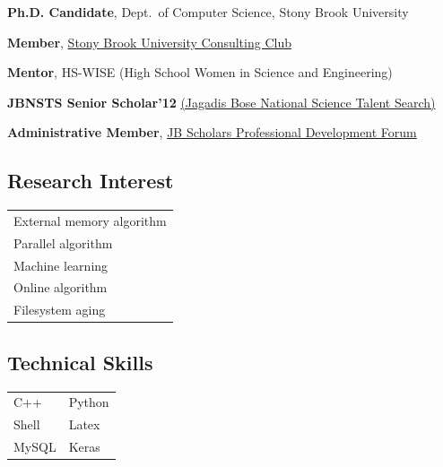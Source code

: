 \documentclass[letterpaper,10pt]{article}
\begin{document}
\begin{minipage}{0.65\textwidth}
\resumeSubHeadingListStart
\item \textbf{Ph.D. Candidate}, Dept.\ of Computer Science, Stony Brook University
\item \textbf{Member}, \href{https://sbuconsultingclub.wixsite.com/sbucc}{Stony Brook University Consulting Club} 
\item \textbf{Mentor}, HS-WISE (High School Women in Science and Engineering)
\item \textbf{JBNSTS Senior Scholar'12} \href{https://jbnsts.ac.in}{(Jagadis Bose National Science Talent Search)}
\item \textbf{Administrative Member}, \href{https://sites.google.com/view/jbspdf/home}{JB Scholars Professional Development Forum}
\resumeSubHeadingListEnd
\end{minipage}
\begin{minipage}{0.1\textwidth}
\end{minipage}
\begin{minipage}{0.25\textwidth}
\subsection*{Research Interest}
\begin{center}
\begin{tabular*}{\textwidth}{ m{5cm} }
\rowcolor{Gray} External memory algorithm \\
\rowcolor{Gray} Parallel algorithm \\
\rowcolor{Gray} Machine learning \\
\rowcolor{Gray} Online algorithm \\
\rowcolor{Gray} Filesystem aging \\
\end{tabular*}
\end{center}
\subsection*{Technical Skills}
\begin{center}
\begin{tabular*}{\textwidth}{ m{3cm} m{2cm} }
\rowcolor{Gray} C++ & Python \\
\rowcolor{Gray} Shell & Latex \\
\rowcolor{Gray} MySQL & Keras \\
\end{tabular*}
\end{center}
\end{minipage}
\end{document}
